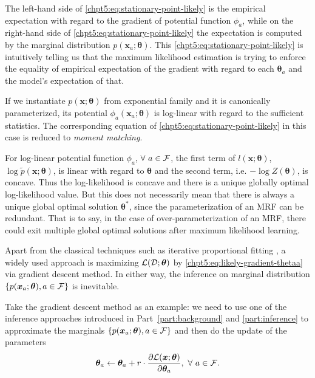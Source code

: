 The left-hand side of \eqref{chpt5:eq:stationary-point-likely} is the empirical expectation with regard to the gradient of potential function $\phi_a$, while on the right-hand side of \eqref{chpt5:eq:stationary-point-likely} the expectation is computed by the marginal distribution $p(\bm{x}_a; \bm{\theta})$. This \eqref{chpt5:eq:stationary-point-likely} is intuitively telling us that the maximum likelihood estimation is trying to enforce the equality of empirical expectation of the gradient with regard to each $\bm{\theta}_a$ and the model's expectation of that.
\begin{remark}
  If we instantiate $p(\bm{x};\bm{\theta})$ from exponential family and it is canonically parameterized, its potential $\phi_a(\bm{x}_a; \bm{\theta})$ is log-linear with regard to the sufficient statistics. The corresponding equation of \eqref{chpt5:eq:stationary-point-likely} in this case is reduced to \textit{moment matching}.

  For log-linear potential function $\phi_a$, $\forall ~a \in \mathcal{F}$, the first term of $l(\bm{x}; \bm{\theta})$, $\log{\tilde{p}(\bm{x};\bm{\theta})}$, is linear with regard to $\bm{\theta}$ and the second term, i.e. $-\log{Z(\bm{\theta})}$, is concave. Thus the log-likelihood is concave and there is a unique globally optimal log-likelihood value. But this does not necessarily mean that there is always a unique global optimal solution $\bm{\theta}^{\ast}$, since the parameterization of an MRF can be redundant. That is to say, in the case of over-parameterization of an MRF, there could exit multiple global optimal solutions after maximum likelihood learning.
  
\end{remark}

Apart from the classical techniques such as iterative proportional fitting \cite[Section~6.1]{wainwright2008graphical}\cite{eric10-708ipf}, a widely used approach is maximizing $\mathcal{L}(\mathcal{D}; \bm{\theta})$ by \eqref{chpt5:eq:likely-gradient-thetaa} via gradient descent method. In either way, the inference on marginal distribution $\left\{ p(\bm{x}_a; \bm{\theta}), a \in \mathcal{F} \right\}$ is inevitable.

Take the gradient descent method as an example: we need to use one of the inference approaches introduced in Part~\ref{part:background} and \ref{part:inference} to approximate the marginals $\left\{ p(\bm{x}_a; \bm{\theta}), a \in \mathcal{F} \right\}$ and then do the update of the parameters
\begin{equation}
  \bm{\theta}_a \leftarrow \bm{\theta}_a + r \cdot \frac{ \partial \mathcal{L}(\bm{x};\bm{\theta})}{\partial \bm{\theta}_a}, ~\forall~a \in \mathcal{F}.
\end{equation}

